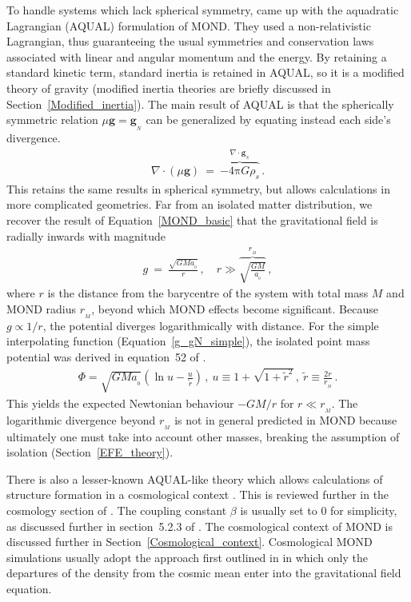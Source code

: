 \documentclass[fleqn,usenatbib,useAMS,onecolumn]{mnras} %
\begin{document}
To handle systems which lack spherical symmetry, \citet{Bekenstein_Milgrom_1984} came up with the aquadratic Lagrangian (AQUAL) formulation of MOND. They used a non-relativistic Lagrangian, thus guaranteeing the usual symmetries and conservation laws associated with linear and angular momentum and the energy. By retaining a standard kinetic term, standard inertia is retained in AQUAL, so it is a modified theory of gravity (modified inertia theories are briefly discussed in Section~\ref{Modified_inertia}). The main result of AQUAL is that the spherically symmetric relation $\mu \bm{g} = \bm{g}_{_N}$ can be generalized by equating instead each side's divergence.
\begin{eqnarray}
	\nabla \cdot \left( \mu \bm{g} \right) ~=~ \overbrace{-4 \mathrm{\pi}  G \rho_s}^{\nabla \cdot \bm{g}_{_N}} \, .
	\label{Governing_equation_AQUAL}
\end{eqnarray}
This retains the same results in spherical symmetry, but allows calculations in more complicated geometries. Far from an isolated matter distribution, we recover the result of Equation~\ref{MOND_basic} that the gravitational field is radially inwards with magnitude
\begin{eqnarray}
	g ~=~ \frac{\sqrt{GMa_{_0}}}{r} \, , \quad r \gg \overbrace{\sqrt{\frac{GM}{a_{_0}}}}^{r_{_M}} \, ,
	\label{Point_mass_force_law_DML}
 \end{eqnarray}
where $r$ is the distance from the barycentre of the system with total mass $M$ and MOND radius $r_{_M}$, beyond which MOND effects become significant. Because $g \propto 1/r$, the potential diverges logarithmically with distance. For the simple interpolating function (Equation~\ref{g_gN_simple}), the isolated point mass potential was derived in equation~52 of \citet*{Banik_Ryan_2018}.
\begin{eqnarray}
	\Phi = \sqrt{GMa_{_0}} \left( \ln u - \frac{u}{\widetilde{r}} \right) \, , ~ u \equiv 1 + \sqrt{1 + {\widetilde{r}}^2} \, , ~ \widetilde{r} \equiv \frac{2r}{r_{_M}} \, .
	\label{Phi_point_simple}
\end{eqnarray}
This yields the expected Newtonian behaviour $-GM/r$ for $r \ll r_{_M}$. The logarithmic divergence beyond $r_{_M}$ is not in general predicted in MOND because ultimately one must take into account other masses, breaking the assumption of isolation (Section~\ref{EFE_theory}).

There is also a lesser-known AQUAL-like theory which allows calculations of structure formation in a cosmological context \citep{Sanders_2001}. This is reviewed further in the cosmology section of \citet{Sanders_2002}. The coupling constant $\beta$ is usually set to 0 for simplicity, as discussed further in section~5.2.3 of \citet*{Haslbauer_2020}. The cosmological context of MOND is discussed further in Section~\ref{Cosmological_context}. Cosmological MOND simulations usually adopt the approach first outlined in \citet{Nusser_2002} in which only the departures of the density from the cosmic mean enter into the gravitational field equation.
\end{document}
